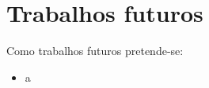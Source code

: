 
\section{Trabalhos futuros}

Como trabalhos futuros pretende-se:

\begin{itemize}
    \item a
\end{itemize}